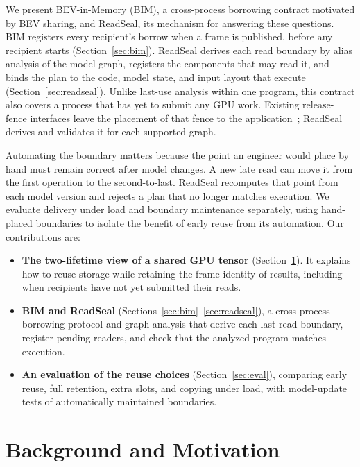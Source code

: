 \documentclass[conference]{IEEEtran}
\begin{document}
We present BEV-in-Memory (BIM), a cross-process borrowing contract motivated by BEV sharing, and ReadSeal, its mechanism for answering these questions. BIM registers every recipient's borrow when a frame is published, before any recipient starts (Section~\ref{sec:bim}). ReadSeal derives each read boundary by alias analysis of the model graph, registers the components that may read it, and binds the plan to the code, model state, and input layout that execute (Section~\ref{sec:readseal}). Unlike last-use analysis within one program, this contract also covers a process that has yet to submit any GPU work. Existing release-fence interfaces leave the placement of that fence to the application~\cite{bufferqueue,nvscistream}; ReadSeal derives and validates it for each supported graph.

Automating the boundary matters because the point an engineer would place by hand must remain correct after model changes. A new late read can move it from the first operation to the second-to-last. ReadSeal recomputes that point from each model version and rejects a plan that no longer matches execution. We evaluate delivery under load and boundary maintenance separately, using hand-placed boundaries to isolate the benefit of early reuse from its automation. Our contributions are:
\begin{itemize}
\item \textbf{The two-lifetime view of a shared GPU tensor} (Section~\ref{sec:motivation}). It explains how to reuse storage while retaining the frame identity of results, including when recipients have not yet submitted their reads.
\item \textbf{BIM and ReadSeal} (Sections~\ref{sec:bim}--\ref{sec:readseal}), a cross-process borrowing protocol and graph analysis that derive each last-read boundary, register pending readers, and check that the analyzed program matches execution.
\item \textbf{An evaluation of the reuse choices} (Section~\ref{sec:eval}), comparing early reuse, full retention, extra slots, and copying under load, with model-update tests of automatically maintained boundaries.
\end{itemize}

\section{Background and Motivation}
\label{sec:motivation}
\end{document}
